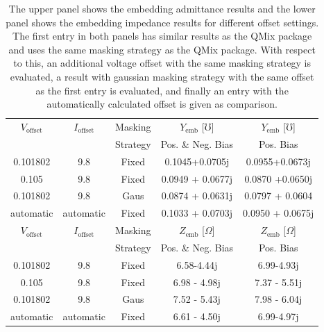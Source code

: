 \documentclass[]{article}
\begin{document}
\begin{table}[]
	\centering
	\renewcommand{\arraystretch}{1.5}
	\begin{tabular}{ccccc}\hline
		$V_\text{offset}$ & $I_\text{offset}$ & Masking & $Y_\text{emb}$ [$\mho$]  & $Y_\text{emb}$ [$\mho$]\\
		&&Strategy&Pos. \& Neg. Bias&Pos. Bias \\\hline
		0.101802 & 9.8 & Fixed & 0.1045+0.0705j & 0.0955+0.0673j \\
		0.105 & 9.8 & Fixed & 0.0949 + 0.0677j & 0.0870 +0.0650j \\
		0.101802 & 9.8 & Gaus & 0.0874 + 0.0631j & 0.0797 + 0.0604 \\
		automatic & automatic & Fixed & 0.1033 + 0.0703j & 0.0950 + 0.0675j \\\hline
		$V_\text{offset}$ & $I_\text{offset}$ & Masking  & $Z_\text{emb}$ [$\Omega$] & $Z_\text{emb}$ [$\Omega$] \\
		&&Strategy&Pos. \& Neg. Bias&Pos. Bias \\\hline
		0.101802 & 9.8 & Fixed & 6.58-4.44j & 6.99-4.93j \\
		0.105 & 9.8 & Fixed & 6.98 - 4.98j & 7.37 - 5.51j \\
		0.101802 & 9.8 & Gaus & 7.52 - 5.43j & 7.98 - 6.04j \\
		automatic & automatic & Fixed & 6.61 - 4.50j & 6.99-4.97j
	\end{tabular}
\caption{The upper panel shows the embedding admittance results and the lower panel shows the embedding impedance results for different offset settings. The first entry in both panels has similar results as the QMix package and uses the same masking strategy as the QMix package. With respect to this, an additional voltage offset with the same masking strategy is evaluated, a result with gaussian masking strategy with the same offset as the first entry is evaluated, and finally an entry with the automatically calculated offset is given as comparison. }
\label{tab:OffsetedData}
\end{table}
\end{document}
